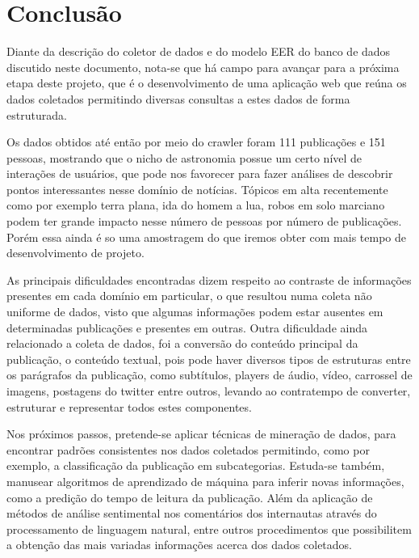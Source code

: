 
\section{Conclusão}

Diante da descrição do coletor de dados e do modelo EER do banco de dados discutido neste documento, nota-se que há campo para avançar para a próxima etapa deste projeto, que é o desenvolvimento de uma aplicação web que reúna os dados coletados permitindo diversas consultas a estes dados de forma estruturada.

Os dados obtidos até então por meio do crawler foram 111 publicações e 151 pessoas, mostrando que o nicho de astronomia possue um certo nível de interações de usuários, que pode nos favorecer para fazer análises de descobrir pontos interessantes nesse domínio de notícias. Tópicos em alta recentemente como por exemplo terra plana, ida do homem a lua, robos em solo marciano podem ter grande impacto nesse número de pessoas por número de publicações. Porém essa ainda é so uma amostragem do que iremos obter com mais tempo de desenvolvimento de projeto.

As principais dificuldades encontradas dizem respeito ao contraste de informações presentes em cada domínio em particular, o que resultou numa coleta não uniforme de dados, visto que algumas informações podem estar ausentes em determinadas publicações e presentes em outras. Outra dificuldade ainda relacionado a coleta de dados, foi a conversão do conteúdo principal da publicação, o conteúdo textual, pois pode haver diversos tipos de estruturas entre os parágrafos da publicação, como subtítulos, players de áudio, vídeo, carrossel de imagens, postagens do twitter entre outros, levando ao contratempo de converter, estruturar e representar todos estes componentes.


Nos próximos passos, pretende-se aplicar técnicas de mineração de dados, para encontrar padrões consistentes nos dados coletados permitindo, como por exemplo, a classificação da publicação em subcategorias. Estuda-se também, manusear algoritmos de aprendizado de máquina para inferir novas informações, como a predição do tempo de leitura da publicação. Além da aplicação de métodos de análise sentimental nos comentários dos internautas através do processamento de linguagem natural, entre outros procedimentos que possibilitem a obtenção das mais variadas informações acerca dos dados coletados.
